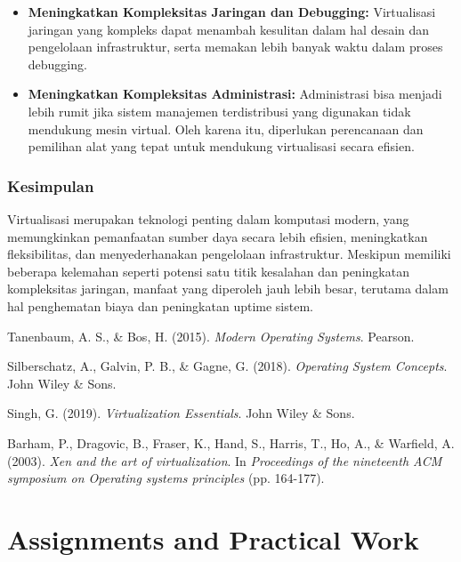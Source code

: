 \documentclass[12pt]{article}
\begin{document}
\begin{enumerate}
\begin{itemize}
    \item \textbf{Meningkatkan Kompleksitas Jaringan dan Debugging:} 
    Virtualisasi jaringan yang kompleks dapat menambah kesulitan dalam hal desain dan pengelolaan infrastruktur, serta memakan lebih banyak waktu dalam proses debugging.
    
    \item \textbf{Meningkatkan Kompleksitas Administrasi:} 
    Administrasi bisa menjadi lebih rumit jika sistem manajemen terdistribusi yang digunakan tidak mendukung mesin virtual. Oleh karena itu, diperlukan perencanaan dan pemilihan alat yang tepat untuk mendukung virtualisasi secara efisien.
\end{itemize}
\end{enumerate}

\subsubsection{Kesimpulan}
Virtualisasi merupakan teknologi penting dalam komputasi modern, yang memungkinkan pemanfaatan sumber daya secara lebih efisien, meningkatkan fleksibilitas, dan menyederhanakan pengelolaan infrastruktur. Meskipun memiliki beberapa kelemahan seperti potensi satu titik kesalahan dan peningkatan kompleksitas jaringan, manfaat yang diperoleh jauh lebih besar, terutama dalam hal penghematan biaya dan peningkatan uptime sistem.

\newpage

\begin{thebibliography}{9}
     Tanenbaum, A. S., \& Bos, H. (2015). \textit{Modern Operating Systems}. Pearson.
    
     Silberschatz, A., Galvin, P. B., \& Gagne, G. (2018). \textit{Operating System Concepts}. John Wiley \& Sons.
    
     Singh, G. (2019). \textit{Virtualization Essentials}. John Wiley \& Sons.
    
     Barham, P., Dragovic, B., Fraser, K., Hand, S., Harris, T., Ho, A., \& Warfield, A. (2003). \textit{Xen and the art of virtualization}. In \textit{Proceedings of the nineteenth ACM symposium on Operating systems principles} (pp. 164-177).
\end{thebibliography}


\section{Assignments and Practical Work}
\end{document}
